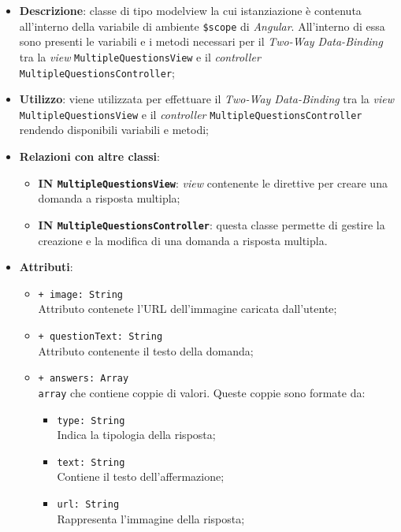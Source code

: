 \begin{itemize}
	\item \textbf{Descrizione}: classe di tipo modelview la cui istanziazione è contenuta all'interno della variabile di ambiente \texttt{\$scope} di \textit{Angular}. All'interno di essa sono presenti le variabili e i metodi necessari per il \textit{Two-Way Data-Binding} tra la \textit{view} \texttt{MultipleQuestionsView} e il \textit{controller} \texttt{MultipleQuestionsController}; 
	\item \textbf{Utilizzo}: viene utilizzata per effettuare il \textit{Two-Way Data-Binding} tra la \textit{view} \\\texttt{MultipleQuestionsView} e il \textit{controller} \texttt{MultipleQuestionsController} rendendo disponibili variabili e metodi;
	\item \textbf{Relazioni con altre classi}:
	\begin{itemize}
		\item \textbf{IN \texttt{MultipleQuestionsView}}: \textit{view} contenente le direttive per creare una domanda a risposta multipla; 
		\item \textbf{IN \texttt{MultipleQuestionsController}}: questa classe permette di gestire la creazione e la modifica di una domanda a risposta multipla.
	\end{itemize}
	\item \textbf{Attributi}:
	\begin{itemize}
		\item \texttt{+ image: String} \\ Attributo contenete l'URL dell'immagine caricata dall'utente;
		\item \texttt{+ questionText: String} \\ Attributo contenente il testo della domanda;
		\item \texttt{+ answers: Array}\\ \texttt{array} che contiene coppie di valori. Queste coppie sono formate da:
		\begin{itemize}
			\item \texttt{type: String} \\ Indica la tipologia della risposta;
			\item \texttt{text: String} \\ Contiene il testo dell'affermazione;
			\item \texttt{url: String} \\ Rappresenta l'immagine della risposta;

\end{itemize}
\end{itemize}
\end{itemize}
